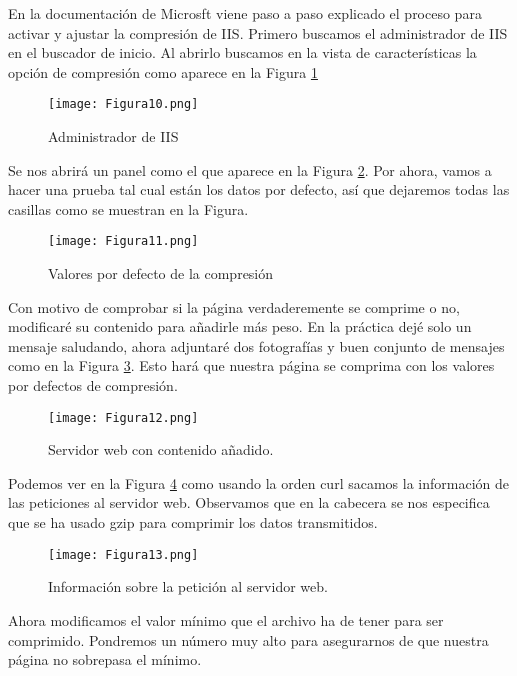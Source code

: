 En la documentación de Microsft\cite{compress} viene paso a paso explicado el proceso para activar y ajustar la compresión de IIS. Primero
buscamos el administrador de IIS en el buscador de inicio. Al abrirlo buscamos en la vista de características la opción de compresión como 
aparece en la Figura \ref{fig:figura10}

\begin{figure}[H] 
\centering
\texttt{[image: Figura10.png]}  
\caption{Administrador de IIS}\label{fig:figura10}
\end{figure}

Se nos abrirá un panel como el que aparece en la Figura \ref{fig:figura11}. Por ahora, vamos a hacer una prueba tal cual están los datos por 
defecto, así que dejaremos todas las casillas como se muestran en la Figura.

\begin{figure}[H] 
\centering
\texttt{[image: Figura11.png]}  
\caption{Valores por defecto de la compresión}\label{fig:figura11}
\end{figure}

Con motivo de comprobar si la página verdaderemente se comprime o no, modificaré su contenido para añadirle más peso. En la práctica dejé solo
un mensaje saludando, ahora adjuntaré dos fotografías y buen conjunto de mensajes como en la Figura \ref{fig:figura12}. Esto hará que nuestra
página se comprima con los valores por defectos de compresión.

\begin{figure}[H] 
\centering
\texttt{[image: Figura12.png]}  
\caption{Servidor web con contenido añadido.}\label{fig:figura12}
\end{figure}

Podemos ver en la Figura \ref{fig:figura13} como usando la orden curl\cite{mancurl} sacamos la información de las peticiones al servidor web. 
Observamos que en la cabecera se nos especifica que se ha usado gzip para comprimir los datos transmitidos.


\begin{figure}[H] 
\centering
\texttt{[image: Figura13.png]}  
\caption{Información sobre la petición al servidor web.}\label{fig:figura13}
\end{figure}

Ahora modificamos el valor mínimo que el archivo ha de tener para ser comprimido. Pondremos un número muy alto para asegurarnos de que nuestra
página no sobrepasa el mínimo. 

